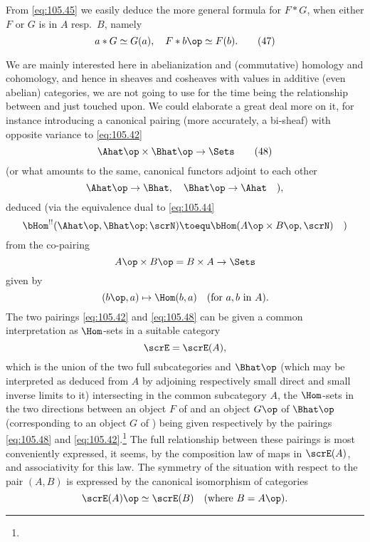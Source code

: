 From \eqref{eq:105.45} we easily deduce the more general formula for
$F*G$, when either $F$ or $G$ is in $A$ resp.\ $B$, namely
\begin{equation}
  \label{eq:105.47}
  a * G \simeq G(a), \quad F * b\op \simeq F(b).\tag{47}
\end{equation}
\begin{remarks}
  We are mainly interested here in abelianization and (commutative)
  homology and cohomology, and hence in sheaves and cosheaves with
  values in additive (even abelian) categories, we are not going to
  use for the time being the relationship between \Ahat{} and \Bhat{}
  just touched upon. We could elaborate a great deal more on it, for
  instance introducing a canonical pairing (more accurately, a
  bi-sheaf) with opposite variance to \eqref{eq:105.42}
  \begin{equation}
    \label{eq:105.48}
    \Ahat\op\times\Bhat\op\to\Sets\tag{48}
  \end{equation}
  (or what amounts to the same, canonical functors adjoint to each
  other
  \[\Ahat\op\to\Bhat,\quad\Bhat\op\to\Ahat\quad),\]
  deduced (via the equivalence dual to \eqref{eq:105.44}
  \[\bHom^{!!}(\Ahat\op,\Bhat\op;\scrN) \toequ \bHom(A\op\times
  B\op,\scrN)\quad)\]
  from the co-pairing
  \[A\op\times B\op=B\times A\to\Sets\]
  given by
  \[(b\op,a)\mapsto\Hom(b,a)\quad(\text{for $a,b$ in $A$}).\]
  The two pairings \eqref{eq:105.42} and \eqref{eq:105.48} can be
  given a common interpretation as $\Hom$-sets in a suitable category
  \[\scrE=\scrE(A),\]
  which is the union of the two full subcategories \Ahat{} and
  $\Bhat\op$ (which may be interpreted as deduced from $A$ by
  adjoining respectively small direct and small inverse limits to it)
  intersecting in the common subcategory $A$, the $\Hom$-sets in the
  two directions between an object $F$ of \Ahat{} and an object $G\op$
  of $\Bhat\op$ (corresponding to an object $G$ of \Bhat) being given
  respectively by the pairings \eqref{eq:105.48} and
  \eqref{eq:105.42}.\footnote{}
  The full relationship between these pairings is most conveniently
  expressed, it seems, by the composition law of maps in $\scrE(A)$,
  and associativity for this law. The symmetry of the situation with
  respect to the pair $(A,B)$ is expressed by the canonical
  isomorphism of categories
  \[\scrE(A)\op\simeq\scrE(B)\quad (\text{where $B=A\op$}).\]
\end{remarks}

